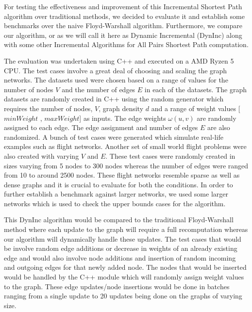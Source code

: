 \documentclass[conference]{IEEEtran}
\begin{document}
For testing the effectiveness and improvement of this Incremental Shortest Path algorithm over traditional methods, we decided to evaluate it and establish some benchmarks over the naive Floyd-Warshall algorithm. Furthermore, we compare our algorithm, or as we will call it here as Dynamic Incremental (DynInc) along with some other Incremental Algorithms for All Pairs Shortest Path computation. 

The evaluation was undertaken using C++ and executed on a AMD Ryzen 5 CPU. The test cases involve a great deal of choosing and scaling the graph networks. The datasets used were chosen based on a range of values for the number of nodes \(V\)  and the number of edges \(E\) in each of the datasets. The graph datasets are randomly created in C++ using the random generator which requires the number of nodes, \(V\), graph density \(d\) and a range of weight values [\(minWeight\) , \(maxWeight\)] as inputs. The edge weights \( \omega (u,v)\) are randomly assigned to each edge. The edge assignment and number of edges \(E\) are also randomized. A bunch of test cases were generated which simulate real-life examples such as flight networks. Another set of small world flight problems were also created with varying \(V\) and \(E\). These test cases were randomly created in sizes varying from 5 nodes to 300 nodes whereas the number of edges were ranged from 10 to around 2500 nodes. These flight networks resemble sparse as well as dense graphs and it is crucial to evaluate for both the conditions. In order to further establish a benchmark against larger networks, we used some larger networks \cite{nr} which is used to check the upper bounds cases for the algorithm. 

This DynInc algorithm would be compared to the traditional Floyd-Warshall method where each update to the graph will require a full recomputation whereas our algorithm will dynamically handle these updates. The test cases that would be involve random edge additions or decrease in weights of an already existing edge and would also involve node additions and insertion of random incoming and outgoing edges for that newly added node. The nodes that would be inserted would be handled by the C++ module which will randomly assign weight values to the graph. These edge updates/node insertions would be done in batches ranging from a single update to 20 updates being done on the graphs of varying size. 
\end{document}
